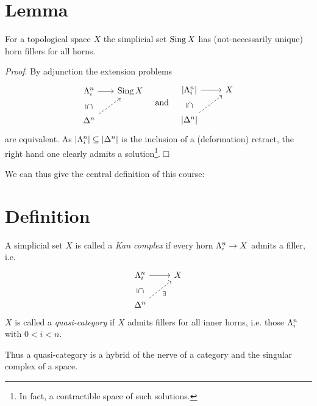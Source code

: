     \section{Lemma}
        For a topological space $X$ the simplicial set $\operatorname{Sing} X$ has (not-necessarily unique) horn fillers for all horns.
        \smallskip
        
        \emph{Proof}. By adjunction the extension problems
        \begin{equation*}
            \begin{tikzcd}[column sep=scriptsize]
                \horn{n}{i} \arrow[r] \arrow[d, phantom, "\subseteq" rotate=-90] & \Sing X \\
                \Delta^n \arrow[ru, dashed]           &        
            \end{tikzcd}
            \quad \text{and} \quad
            \begin{tikzcd}
                \gr{\horn{n}{i}} \arrow[r] \arrow[d, phantom, "\subseteq" rotate=-90] & X \\
                \gr{\Delta^n} \arrow[ru, dashed]           &        
            \end{tikzcd}
        \end{equation*}
        are equivalent. As $\left| \Lambda^{n}_{i} \right| \subseteq \left| \Delta^n \right|$ is the inclusion of a (deformation) retract, the right hand  one clearly admits a solution\footnote{In fact, a contractible space of such solutions.}.\hfill$\Box$

        We can thus give the central definition of this course:
    \section{Definition}
        A simplicial set $X$ is called a \emph{Kan complex} if every horn $\Lambda^{n}_{i} \to X$ admits a filler, i.e.
        \begin{equation*}
              \begin{tikzcd}
                \horn{n}{i} \arrow[r] \arrow[d, phantom, "\subseteq" rotate=-90] & X \\
                \Delta^n \arrow[ru, dashed, "\exists"']           &        
            \end{tikzcd}
        \end{equation*}
        $X$ is called a \emph{quasi-category} if $X$ admits fillers for all inner horns, i.e. those $\Lambda^{n}_{i}$ with $0 < i < n$.

        Thus a quasi-category is a hybrid of the nerve of a category and the singular complex of a space.

